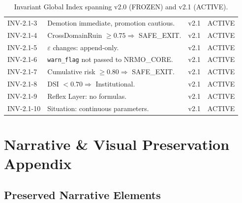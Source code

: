 \begin{table}[ht]
\begin{tabularx}{\linewidth}{lXll}
INV-2.1-3  & Demotion immediate, promotion cautious. & v2.1
& ACTIVE \\

INV-2.1-4  & CrossDomainRuin $\ge 0.75 \Rightarrow$ SAFE\_EXIT.
& v2.1 & ACTIVE \\

INV-2.1-5  & $\varepsilon$ changes: append-only. & v2.1 & ACTIVE \\

INV-2.1-6  & \texttt{warn\_flag} not passed to NRMO\_CORE.
& v2.1 & ACTIVE \\

INV-2.1-7  & Cumulative risk $\ge 0.80 \Rightarrow$ SAFE\_EXIT.
& v2.1 & ACTIVE \\

INV-2.1-8  & DSI $< 0.70 \Rightarrow$ Institutional. & v2.1
& ACTIVE \\

INV-2.1-9  & Reflex Layer: no formulas. & v2.1 & ACTIVE \\

INV-2.1-10 & Situation: continuous parameters. & v2.1 & ACTIVE \\

\bottomrule
\end{tabularx}
\caption[Invariant global index]{Invariant Global Index spanning
v2.0 (FROZEN) and v2.1 (ACTIVE).}
\label{tab:invariant-global-index}
\end{table}

\section{Narrative \& Visual Preservation Appendix}
\label{sec:narrative-visual-preservation}



\subsection{Preserved Narrative Elements}

